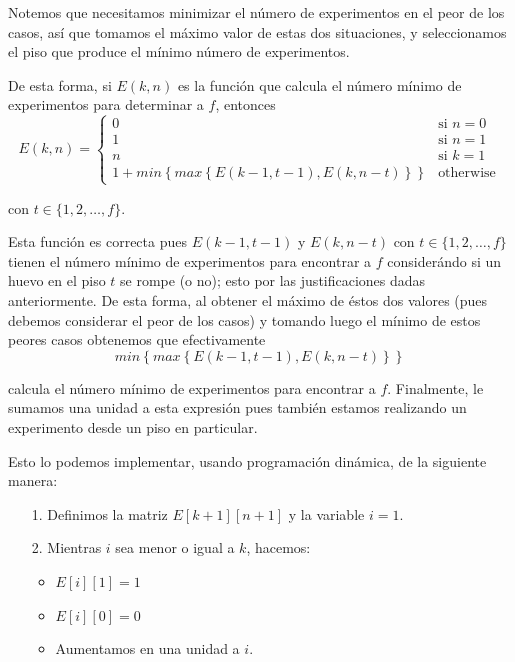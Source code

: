 \documentclass[letterpaper,11pt]{article}
\begin{document}
\begin{enumerate}
\begin{enumerate}
        Notemos que necesitamos minimizar el número de experimentos en el peor 
        de los casos, así que tomamos el máximo valor de estas dos situaciones, 
        y seleccionamos el piso que produce el mínimo número de experimentos.

        De esta forma, si $E(k,n)$ es la función que calcula el número mínimo 
        de experimentos para determinar a $f$, entonces 
        \begin{equation*}
            E(k, n) = 
            \begin{cases}
                0 & \text{si $n =0$} \\
                1 & \text{si $n = 1$} \\
                n & \text{si $k = 1$} \\
                1 + min\left\{max\left\{E(k-1, t-1), E(k, n-t)\right\}\right\} & 
                \text{otherwise}
            \end{cases}
        \end{equation*}

        con $t \in \{1, 2, \ldots, f\}$.
    \end{enumerate}

    Esta función es correcta pues $E(k-1, t-1)$ y $E(k, n-t)$ con 
    $t \in \{1, 2, \ldots, f\}$ tienen el número mínimo de experimentos
    para encontrar a $f$ considerándo si un huevo en el piso $t$ se 
    rompe (o no); esto por las justificaciones dadas anteriormente. De 
    esta forma, al obtener el máximo de éstos dos valores (pues debemos 
    considerar el peor de los casos) y tomando luego el mínimo de estos 
    peores casos obtenemos que efectivamente 
    \begin{equation*}
        min\left\{max\left\{E(k-1, t-1), E(k, n-t)\right\}\right\}
    \end{equation*}

    calcula el número mínimo de experimentos para encontrar a $f$. 
    Finalmente, le sumamos una unidad a esta expresión pues también 
    estamos realizando un experimento desde un piso en particular.

    Esto lo podemos implementar, usando programación dinámica, de la siguiente 
    manera: 
    \begin{itemize}
        \item[1.] Definimos la matriz $E[k+1][n+1]$ y la variable $i=1$.

        \item[2.] Mientras $i$ sea menor o igual a $k$, hacemos:
        \begin{itemize}
            \item $E[i][1] = 1$
            \item $E[i][0] = 0$
            \item Aumentamos en una unidad a $i$.
        \end{itemize}


\end{itemize}
\end{enumerate}
\end{document}
